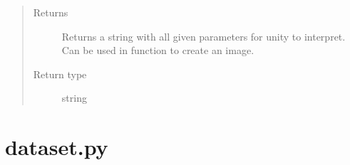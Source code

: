 \documentclass[letterpaper,10pt,english]{sphinxmanual}
\begin{document}
\begin{fulllineitems}
\begin{fulllineitems}
\begin{quote}
\begin{description}
\item[{Returns}] \leavevmode
Returns a string with all given parameters for unity to interpret. Can be used in function {\hyperref[\detokenize{index:client.client_communicator_to_unity.receive_image}]{}} to create an image.

\item[{Return type}] \leavevmode
string

\end{description}\end{quote}

\end{fulllineitems}


\end{fulllineitems}



\section{dataset.py}
\label{\detokenize{index:dataset-py}}
\end{document}
